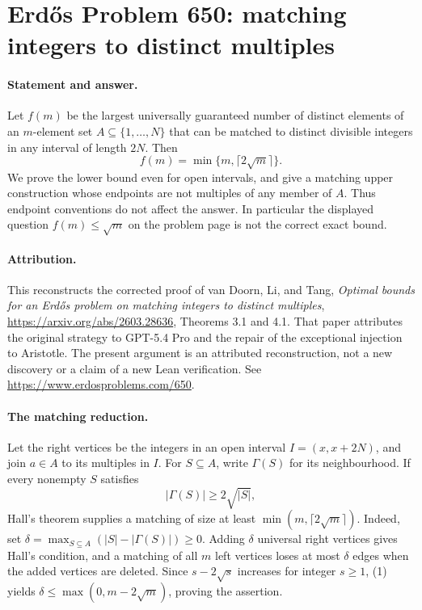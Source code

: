 \section*{Erd\H{o}s Problem 650: matching integers to distinct multiples}

\paragraph{Statement and answer.}
Let \(f(m)\) be the largest universally guaranteed number of distinct
elements of an \(m\)-element set \(A\subseteq\{1,\ldots,N\}\) that
can be matched to distinct divisible integers in any interval of
length \(2N\). Then
\[
 \boxed{f(m)=\min\{m,\lceil2\sqrt m\rceil\}.}
\]
We prove the lower bound even for open intervals, and give a matching
upper construction whose endpoints are not multiples of any member
of \(A\). Thus endpoint conventions do not affect the answer.
In particular the displayed question \(f(m)\leq\sqrt m\) on the
problem page is not the correct exact bound.

\paragraph{Attribution.}
This reconstructs the corrected proof of van Doorn, Li, and Tang,
\emph{Optimal bounds for an Erd\H{o}s problem on matching integers
to distinct multiples}, \url{https://arxiv.org/abs/2603.28636},
Theorems 3.1 and 4.1. That paper attributes the original strategy to
GPT-5.4 Pro and the repair of the exceptional injection to Aristotle.
The present argument is an attributed reconstruction, not a new
discovery or a claim of a new Lean verification.
See \url{https://www.erdosproblems.com/650}.

\paragraph{The matching reduction.}
Let the right vertices be the integers in an open interval
\(I=(x,x+2N)\), and join \(a\in A\) to its multiples in \(I\).
For \(S\subseteq A\), write \(\Gamma(S)\) for its neighbourhood.
If every nonempty \(S\) satisfies
\[
 |\Gamma(S)|\geq2\sqrt{|S|},                                      \tag{1}
\]
Hall's theorem supplies a matching of size at least
\(\min(m,\lceil2\sqrt m\rceil)\).
Indeed, set
\(\delta=\max_{S\subseteq A}(|S|-|\Gamma(S)|)\geq0\).
Adding \(\delta\) universal right vertices gives Hall's condition,
and a matching of all \(m\) left vertices loses at most \(\delta\)
edges when the added vertices are deleted.
Since \(s-2\sqrt s\) increases for integer \(s\geq1\), (1) yields
\(\delta\leq\max(0,m-2\sqrt m)\), proving the assertion.

